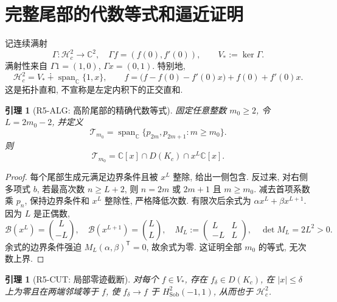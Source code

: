\documentclass[UTF8,fontset=fandol,11pt,a4paper]{ctexart}
\newtheorem{lemma}[theorem]{引理}
\theoremstyle{definition}
\newcommand{\C}{\mathbb C}
\newcommand{\Hs}{H^2_{\mathrm{Sob}}(-1,1)}
\newcommand{\Hc}{\mathcal H_c^2}
\newcommand{\spn}{\operatorname{span}_{\C}}
\newcommand{\Bc}{\mathcal B}
\begin{document}
\section{完整尾部的代数等式和逼近证明}
\label{sec:tail}

记连续满射
\begin{equation}\label{eq:trace}
\Gamma:\Hc\longrightarrow\C^2,\quad
\Gamma f=(f(0),f'(0)),\qquad V_*:=\ker\Gamma.
\end{equation}
满射性来自 $\Gamma1=(1,0)$, $\Gamma x=(0,1)$.
特别地,
\begin{equation}\label{eq:split}
\Hc=V_*\mathbin{\dotplus}\spn\{1,x\},\qquad
f=\bigl(f-f(0)-f'(0)x\bigr)+f(0)+f'(0)x.
\end{equation}
这是拓扑直和, 不宣称是左定内积下的正交直和.

\begin{lemma}[R5-ALG: 高阶尾部的精确代数等式]\label{lem:algebra}
固定任意整数 $m_0\ge2$, 令 $L=2m_0-2$, 并定义
\[
\mathcal T_{m_0}=\spn\{p_{2m},p_{2m+1}:m\ge m_0\}.
\]
则
\begin{equation}\label{eq:algebra}
\mathcal T_{m_0}=\C[x]\cap D(K_c)\cap x^L\C[x].
\end{equation}
\end{lemma}

\begin{proof}
每个尾部生成元满足边界条件且被 $x^L$ 整除, 给出一侧包含.
反过来, 对右侧多项式 $b$, 若最高次数 $n\ge L+2$, 则
$n=2m$ 或 $2m+1$ 且 $m\ge m_0$.
减去首项系数乘 $p_n$, 保持边界条件和 $x^L$ 整除性, 严格降低次数.
有限次后余式为 $\alpha x^L+\beta x^{L+1}$.
因为 $L$ 是正偶数,
\begin{equation}\label{eq:polymatrix}
\Bc(x^L)=\binom L{-L},\quad \Bc(x^{L+1})=\binom LL,\quad
M_L:=\begin{pmatrix}L&L\\-L&L\end{pmatrix},\quad \det M_L=2L^2>0.
\end{equation}
余式的边界条件强迫 $M_L(\alpha,\beta)^{\mathsf T}=0$,
故余式为零. 这证明全部 $m_0$ 的等式, 无次数上界.
\end{proof}

\begin{lemma}[R5-CUT: 局部零迹截断]\label{lem:cutoff}
对每个 $f\in V_*$, 存在 $f_\delta\in D(K_c)$,
在 $|x|\le\delta$ 上为零且在两端邻域等于 $f$, 使
$f_\delta\to f$ 于 $\Hs$, 从而也于 $\Hc$.
\end{lemma}
\end{document}
